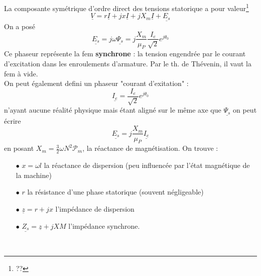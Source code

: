 		La composante symétrique d'ordre direct des tensions statorique a pour 
		valeur\footnote{??}
		\begin{equation}
		\underline{V} = r\underline{I}+jx\underline{I}+jX_m\underline{I}+\underline{E_s}
		\label{eq:VcompoStato}
		\end{equation}
		On a posé 
		\begin{equation}
		\underline{E_s} = j\omega\underline{\Psi_s} = j\dfrac{X_m}{\mu_P}\dfrac{I_e}{
		\sqrt{2}}e^{j\theta_0}
		\end{equation}
		Ce phaseur représente la fem \textbf{synchrone} : la tension engendrée par le 
		courant d'excitation dans les enroulements d'armature. Par le th. de Thévenin, 
		il vaut la fem à vide.\\
		On peut également defini un phaseur "courant d'exitation" :
		\begin{equation}
		\underline{I_e} = \dfrac{I_e}{\sqrt{2}}e^{j\theta_0}
		\end{equation}
		n'ayant aucune réalité physique mais étant aligné sur le même axe que 
		$\underline{\Psi_s}$ on peut écrire
		\begin{equation}
		\underline{E_s} = j\dfrac{X_m}{\mu_P}\underline{I_e}
		\end{equation}
		en posant $X_m = \frac{3}{2}\omega N^2\mathcal{P}_m$, la réactance de 
		magnétisation. On trouve :
		\begin{itemize}
		\item[$\bullet$] $x=\omega l$ la réactance de dispersion (peu influencée par 
		l'état magnétique de la machine)
		\item[$\bullet$] $r$ la résistance d'une phase statorique (souvent négligeable)
		\item[$\bullet$] $\underline{z} = r+jx$ l'impédance de dispersion
		\item[$\bullet$] $\underline{Z_s} = \underline{z}+jXM$ l'impédance synchrone.
		\end{itemize}\ 
		
